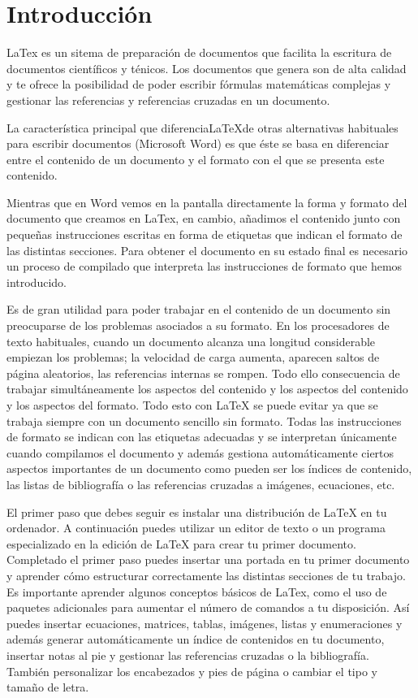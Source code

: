 \documentclass[11pt, a4paper]{article}
\begin{document}

\newpage

\tableofcontents
\thispagestyle{empty}

\newpage{~}
\thispagestyle{empty}
\newpage

\section{Introducción}

LaTex es un sitema de preparación de documentos que facilita la escritura de documentos científicos y ténicos. Los documentos que genera son de alta calidad y te ofrece la posibilidad de poder escribir fórmulas matemáticas complejas y gestionar las referencias y referencias cruzadas en un documento.

La característica principal que diferenciaLaTeXde otras alternativas habituales para escribir documentos (Microsoft Word) es que éste se basa en diferenciar entre el contenido de un documento y el formato con el que se presenta este contenido.

Mientras que en Word vemos en la pantalla directamente la forma y formato del documento que creamos en LaTex, en cambio, añadimos el contenido junto con pequeñas instrucciones escritas en forma de etiquetas que indican el formato de las distintas secciones. Para obtener el documento en su estado final es necesario un proceso de compilado que interpreta las instrucciones de formato que hemos introducido.

Es de gran utilidad para poder trabajar en el contenido de un documento sin preocuparse de los problemas asociados a su formato. En los procesadores de texto habituales, cuando un documento alcanza una longitud considerable empiezan los problemas; la velocidad de carga aumenta, aparecen saltos de página aleatorios, las referencias internas se rompen. Todo ello consecuencia de trabajar simultáneamente los aspectos del contenido y los aspectos del contenido y los aspectos del formato. Todo esto con LaTeX se puede evitar ya que se trabaja siempre con un documento sencillo sin formato. Todas las instrucciones de formato se indican con las etiquetas adecuadas y se interpretan únicamente cuando compilamos el documento y además gestiona automáticamente ciertos aspectos importantes de un documento como pueden ser los índices de contenido, las listas de bibliografía o las referencias cruzadas a imágenes, ecuaciones, etc.

El primer paso que debes seguir es instalar una distribución de LaTeX en tu ordenador. A continuación puedes utilizar un editor de texto o un programa especializado en la edición de LaTeX para crear tu primer documento. Completado el primer paso puedes insertar una portada en tu primer documento y aprender cómo estructurar correctamente las distintas secciones de tu trabajo. Es importante aprender algunos conceptos básicos de LaTex, como el uso de paquetes adicionales para aumentar el número de comandos a tu disposición. Así puedes insertar ecuaciones, matrices, tablas, imágenes, listas y enumeraciones y además generar automáticamente un índice de contenidos en tu documento, insertar notas al pie y gestionar las referencias cruzadas o la bibliografía. También personalizar los encabezados y pies de página o cambiar el tipo y tamaño de letra.
\end{document}
